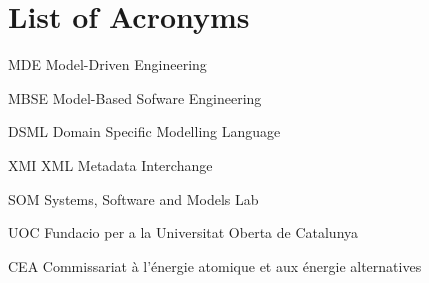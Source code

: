 \section*{List of Acronyms}
\begin{descriptioncompact}
    \item[MDE] {Model-Driven Engineering}
    \item[MBSE] {Model-Based Sofware Engineering}
    \item[DSML] {Domain Specific Modelling Language}
    \item[XMI] {XML Metadata Interchange}
    \item
    \item[SOM] {Systems, Software and Models Lab}
    \item[UOC] {Fundacio per a la Universitat Oberta de Catalunya}
    \item[CEA] {Commissariat à l'énergie atomique et aux énergie alternatives}
\end{descriptioncompact}

